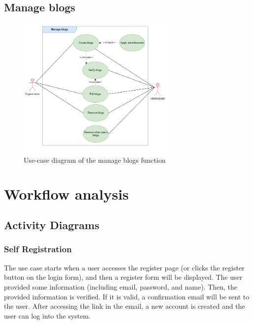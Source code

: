

\subsection{Manage blogs}

\begin {figure}[H]
\centering
\includegraphics[width=0.7\textwidth]{Figures/manage_blog_ucd.png}
\caption{Use-case diagram of the manage blogs function}
\label{fig:manage-blog-activity-diagram}
\end{figure}



\section{Workflow analysis}
\subsection{Activity Diagrams}

\subsubsection{Self Registration}

The use case starts when a user accesses the register page (or clicks the register button on the login form), and then a register form will be displayed. The user provided some information (including email, password, and name). Then,  the provided information is verified. If it is valid, a confirmation email will be sent to the user. After accessing the link in the email, a new account is created and the user can log into the system.

